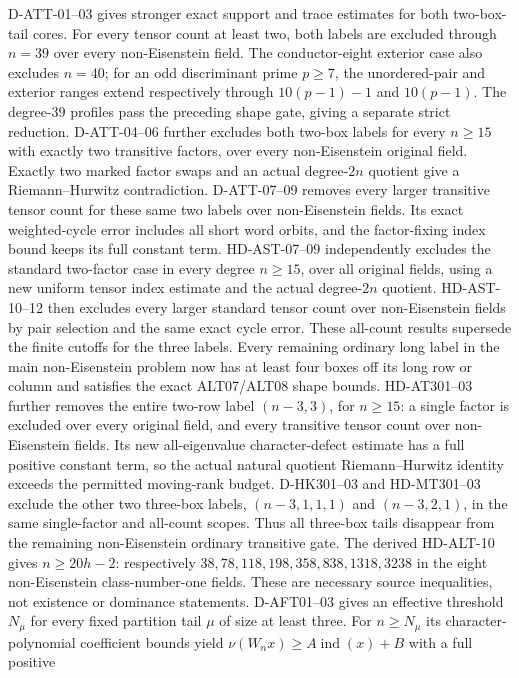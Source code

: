 \documentclass[11pt]{article}
\theoremstyle{remark}\newtheorem{remark}[theorem]{Remark}
\begin{document}
D-ATT-01--03 gives stronger exact support and trace estimates for both
two-box-tail cores. For every tensor count at least two, both labels
are excluded through $n=39$ over every non-Eisenstein field. The
conductor-eight exterior case also excludes $n=40$; for an odd
discriminant prime $p\ge7$, the unordered-pair and exterior ranges
extend respectively through $10(p-1)-1$ and $10(p-1)$.
The degree-$39$ profiles pass the preceding shape gate, giving a
separate strict reduction. D-ATT-04--06 further excludes both
two-box labels for every $n\ge15$ with exactly two transitive factors,
over every non-Eisenstein original field. Exactly two marked factor
swaps and an actual degree-$2n$ quotient give a Riemann--Hurwitz
contradiction. D-ATT-07--09 removes every larger transitive
tensor count for these same two labels over non-Eisenstein fields.
Its exact weighted-cycle error includes all short word orbits, and
the factor-fixing index bound keeps its full constant term.
HD-AST-07--09 independently excludes the standard two-factor case
in every degree $n\ge15$, over all original fields, using a new
uniform tensor index estimate and the actual degree-$2n$ quotient.
HD-AST-10--12 then excludes every larger standard tensor count
over non-Eisenstein fields by pair selection and the same exact
cycle error. These all-count results supersede the finite cutoffs
for the three labels. Every remaining ordinary long label in the
main non-Eisenstein problem now has at least four boxes off its long
row or column and satisfies the exact ALT07/ALT08 shape bounds.
HD-AT301--03 further removes the entire two-row label $(n-3,3)$,
for $n\ge15$: a single factor is excluded over every original
field, and every transitive tensor count over non-Eisenstein fields.
Its new all-eigenvalue character-defect estimate has a full positive
constant term, so the actual natural quotient Riemann--Hurwitz
identity exceeds the permitted moving-rank budget.
D-HK301--03 and HD-MT301--03 exclude the other two three-box
labels, $(n-3,1,1,1)$ and $(n-3,2,1)$, in the same single-factor
and all-count scopes. Thus all three-box tails disappear from
the remaining non-Eisenstein ordinary transitive gate.
The derived HD-ALT-10 gives $n\ge20h-2$: respectively
$38,78,118,198,358,838,1318,3238$ in the eight non-Eisenstein
class-number-one fields. These are necessary source inequalities,
not existence or dominance statements.
D-AFT01--03 gives an effective threshold $N_\mu$ for every
fixed partition tail $\mu$ of size at least three. For
$n\ge N_\mu$ its character-polynomial coefficient bounds yield
$\nu(W_nx)\ge A\operatorname{ind}(x)+B$ with a full positive
\end{document}
